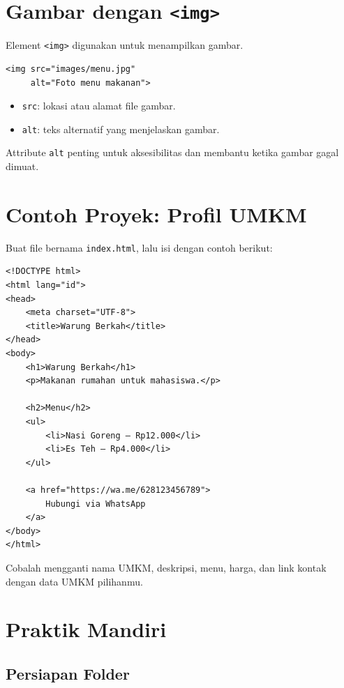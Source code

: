 \documentclass[11pt,a4paper]{article}
\begin{document}
\section{Gambar dengan \texttt{<img>}}

Element \texttt{<img>} digunakan untuk menampilkan gambar.

\begin{lstlisting}[style=htmlstyle]
<img src="images/menu.jpg"
     alt="Foto menu makanan">
\end{lstlisting}

\begin{itemize}
    \item \texttt{src}: lokasi atau alamat file gambar.
    \item \texttt{alt}: teks alternatif yang menjelaskan gambar.
\end{itemize}

Attribute \texttt{alt} penting untuk aksesibilitas dan membantu ketika gambar gagal dimuat.

\section{Contoh Proyek: Profil UMKM}

Buat file bernama \texttt{index.html}, lalu isi dengan contoh berikut:

\begin{lstlisting}[style=htmlstyle]
<!DOCTYPE html>
<html lang="id">
<head>
    <meta charset="UTF-8">
    <title>Warung Berkah</title>
</head>
<body>
    <h1>Warung Berkah</h1>
    <p>Makanan rumahan untuk mahasiswa.</p>

    <h2>Menu</h2>
    <ul>
        <li>Nasi Goreng — Rp12.000</li>
        <li>Es Teh — Rp4.000</li>
    </ul>

    <a href="https://wa.me/628123456789">
        Hubungi via WhatsApp
    </a>
</body>
</html>
\end{lstlisting}

Cobalah mengganti nama UMKM, deskripsi, menu, harga, dan link kontak dengan data UMKM pilihanmu.

\section{Praktik Mandiri}

\subsection{Persiapan Folder}
\end{document}
